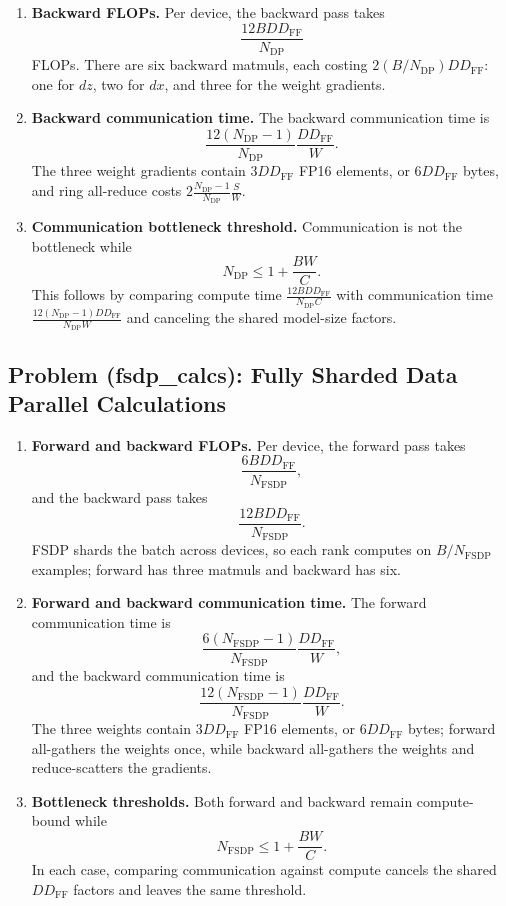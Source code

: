 \documentclass[11pt]{article}
\begin{document}
\begin{enumerate}
  \item \textbf{Backward FLOPs.}
  Per device, the backward pass takes
  \[
    \frac{12BD D_{\mathrm{FF}}}{N_{\mathrm{DP}}}
  \]
  FLOPs. There are six backward matmuls, each costing $2(B/N_{\mathrm{DP}})DD_{\mathrm{FF}}$: one for $dz$, two for $dx$, and three for the weight gradients.

  \item \textbf{Backward communication time.}
  The backward communication time is
  \[
    \frac{12(N_{\mathrm{DP}}-1)}{N_{\mathrm{DP}}}\frac{DD_{\mathrm{FF}}}{W}.
  \]
  The three weight gradients contain $3DD_{\mathrm{FF}}$ FP16 elements, or $6DD_{\mathrm{FF}}$ bytes, and ring all-reduce costs $2\frac{N_{\mathrm{DP}}-1}{N_{\mathrm{DP}}}\frac{S}{W}$.

  \item \textbf{Communication bottleneck threshold.}
  Communication is not the bottleneck while
  \[
    N_{\mathrm{DP}} \le 1 + \frac{BW}{C}.
  \]
  This follows by comparing compute time $\frac{12BD D_{\mathrm{FF}}}{N_{\mathrm{DP}}C}$ with communication time $\frac{12(N_{\mathrm{DP}}-1)DD_{\mathrm{FF}}}{N_{\mathrm{DP}}W}$ and canceling the shared model-size factors.
\end{enumerate}

\subsection{Problem (fsdp\_calcs): Fully Sharded Data Parallel Calculations}

\begin{enumerate}
  \item \textbf{Forward and backward FLOPs.}
  Per device, the forward pass takes
  \[
    \frac{6BD D_{\mathrm{FF}}}{N_{\mathrm{FSDP}}},
  \]
  and the backward pass takes
  \[
    \frac{12BD D_{\mathrm{FF}}}{N_{\mathrm{FSDP}}}.
  \]
  FSDP shards the batch across devices, so each rank computes on $B/N_{\mathrm{FSDP}}$ examples; forward has three matmuls and backward has six.

  \item \textbf{Forward and backward communication time.}
  The forward communication time is
  \[
    \frac{6(N_{\mathrm{FSDP}}-1)}{N_{\mathrm{FSDP}}}\frac{DD_{\mathrm{FF}}}{W},
  \]
  and the backward communication time is
  \[
    \frac{12(N_{\mathrm{FSDP}}-1)}{N_{\mathrm{FSDP}}}\frac{DD_{\mathrm{FF}}}{W}.
  \]
  The three weights contain $3DD_{\mathrm{FF}}$ FP16 elements, or $6DD_{\mathrm{FF}}$ bytes; forward all-gathers the weights once, while backward all-gathers the weights and reduce-scatters the gradients.

  \item \textbf{Bottleneck thresholds.}
  Both forward and backward remain compute-bound while
  \[
    N_{\mathrm{FSDP}} \le 1 + \frac{BW}{C}.
  \]
  In each case, comparing communication against compute cancels the shared $D D_{\mathrm{FF}}$ factors and leaves the same threshold.
\end{enumerate}
\end{document}
